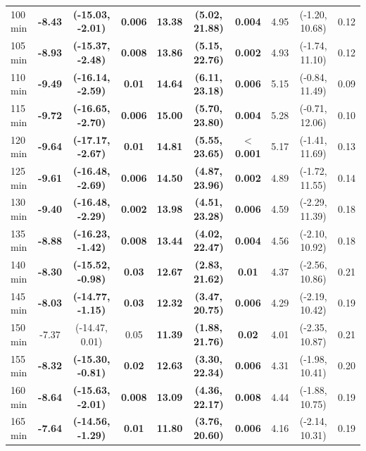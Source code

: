 \begin{table}[ht]
{\begin{tabular}{lccccccccc}
100 min & \textbf{-8.43} & \textbf{(-15.03, -2.01)} & \textbf{0.006} & \textbf{13.38} & \textbf{(5.02, 21.88)} & \textbf{0.004} & 4.95 & (-1.20, 10.68) & 0.12 \\
105 min & \textbf{-8.93} & \textbf{(-15.37, -2.48)} & \textbf{0.008} & \textbf{13.86} & \textbf{(5.15, 22.76)} & \textbf{0.002} & 4.93 & (-1.74, 11.10) & 0.12 \\
110 min & \textbf{-9.49} & \textbf{(-16.14, -2.59)} & \textbf{0.01} & \textbf{14.64} & \textbf{(6.11, 23.18)} & \textbf{0.006} & 5.15 & (-0.84, 11.49) & 0.09 \\
115 min & \textbf{-9.72} & \textbf{(-16.65, -2.70)} & \textbf{0.006} & \textbf{15.00} & \textbf{(5.70, 23.80)} & \textbf{0.004} & 5.28 & (-0.71, 12.06) & 0.10 \\
120 min & \textbf{-9.64} & \textbf{(-17.17, -2.67)} & \textbf{0.01} & \textbf{14.81} & \textbf{(5.55, 23.65)} & \textbf{$<$0.001} & 5.17 & (-1.41, 11.69) & 0.13 \\
125 min & \textbf{-9.61} & \textbf{(-16.48, -2.69)} & \textbf{0.006} & \textbf{14.50} & \textbf{(4.87, 23.96)} & \textbf{0.002} & 4.89 & (-1.72, 11.55) & 0.14 \\
130 min & \textbf{-9.40} & \textbf{(-16.48, -2.29)} & \textbf{0.002} & \textbf{13.98} & \textbf{(4.51, 23.28)} & \textbf{0.006} & 4.59 & (-2.29, 11.39) & 0.18 \\
135 min & \textbf{-8.88} & \textbf{(-16.23, -1.42)} & \textbf{0.008} & \textbf{13.44} & \textbf{(4.02, 22.47)} & \textbf{0.004} & 4.56 & (-2.10, 10.92) & 0.18 \\
140 min & \textbf{-8.30} & \textbf{(-15.52, -0.98)} & \textbf{0.03} & \textbf{12.67} & \textbf{(2.83, 21.62)} & \textbf{0.01} & 4.37 & (-2.56, 10.86) & 0.21 \\
145 min & \textbf{-8.03} & \textbf{(-14.77, -1.15)} & \textbf{0.03} & \textbf{12.32} & \textbf{(3.47, 20.75)} & \textbf{0.006} & 4.29 & (-2.19, 10.42) & 0.19 \\
150 min & -7.37 & (-14.47, 0.01) & 0.05 & \textbf{11.39} & \textbf{(1.88, 21.76)} & \textbf{0.02} & 4.01 & (-2.35, 10.87) & 0.21 \\
155 min & \textbf{-8.32} & \textbf{(-15.30, -0.81)} & \textbf{0.02} & \textbf{12.63} & \textbf{(3.30, 22.34)} & \textbf{0.006} & 4.31 & (-1.98, 10.41) & 0.20 \\
160 min & \textbf{-8.64} & \textbf{(-15.63, -2.01)} & \textbf{0.008} & \textbf{13.09} & \textbf{(4.36, 22.17)} & \textbf{0.008} & 4.44 & (-1.88, 10.75) & 0.19 \\
165 min & \textbf{-7.64} & \textbf{(-14.56, -1.29)} & \textbf{0.01} & \textbf{11.80} & \textbf{(3.76, 20.60)} & \textbf{0.006} & 4.16 & (-2.14, 10.31) & 0.19 \\

\end{tabular}}
\end{table}
